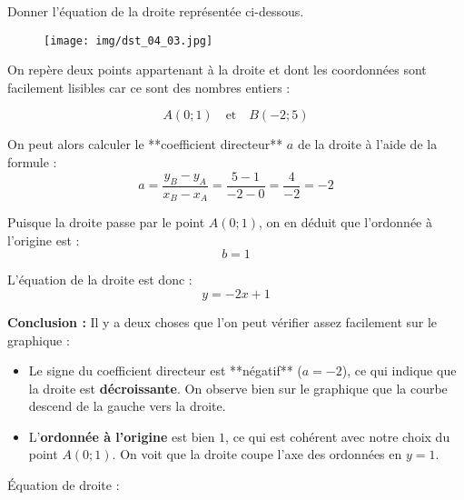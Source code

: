 \documentclass[answers]{exam}
\begin{document}
\begin{questions}

\question[2] Donner l’équation de la droite représentée ci-dessous.

\begin{figure}[H]
  \centering
  \texttt{[image: img/dst\_04\_03.jpg]}
\end{figure}


\begin{solution}
  On repère deux points appartenant à la droite et dont les coordonnées sont facilement lisibles car ce sont des nombres entiers :
  
  \[
  A(0 ; 1) \quad \text{et} \quad B(-2 ; 5)
  \]
  
  On peut alors calculer le **coefficient directeur** \( a \) de la droite à l’aide de la formule :
  \[
  a = \frac{y_B - y_A}{x_B - x_A} = \frac{5 - 1}{-2 - 0} = \frac{4}{-2} = -2
  \]
  
  Puisque la droite passe par le point \( A(0 ; 1) \), on en déduit que l’ordonnée à l’origine est :
  \[
  b = 1
  \]
  
  L’équation de la droite est donc :
  \[
  y = -2x + 1
  \]
  
  \vspace{0.3cm}
  \textbf{Conclusion :} Il y a deux choses que l’on peut vérifier assez facilement sur le graphique :
  \begin{itemize}
    \item Le signe du coefficient directeur est **négatif** (\( a = -2 \)), ce qui indique que la droite est \textbf{décroissante}. On observe bien sur le graphique que la courbe descend de la gauche vers la droite.
    \item L’\textbf{ordonnée à l’origine} est bien \( 1 \), ce qui est cohérent avec notre choix du point \( A(0 ; 1) \). On voit que la droite coupe l’axe des ordonnées en \( y = 1 \).
  \end{itemize}
  \end{solution}

\question[4] Équation de droite :

\end{questions}
\end{document}

